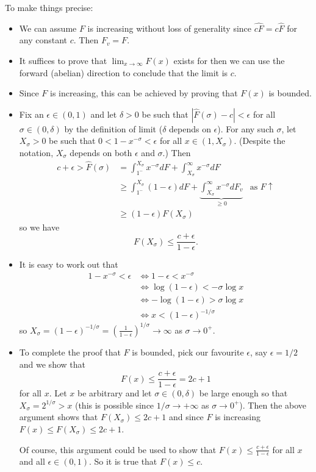 \documentclass[12pt]{article}
\newcommand{\Fhat}{\widehat{F}}
\begin{document}
To make things precise:
\begin{itemize}
\item We can assume $F$ is increasing without loss of generality since $\widehat{c F} = c \Fhat$ for any constant $c$. Then $F_v = F$.

\item It suffices to prove that $\lim_{x \rightarrow \infty} F(x)$ exists for then we can use the forward (abelian) direction to conclude that the limit is $c$.

\item Since $F$ is increasing, this can be achieved by proving that $F(x)$ is bounded.

\item Fix an $\epsilon \in (0, 1)$ and let $\delta > 0$ be such that $|\Fhat(\sigma) - c| < \epsilon$ for all $\sigma \in (0, \delta)$ by the definition of limit ($\delta$ depends on $\epsilon$). For any such $\sigma$, let $X_\sigma > 0$ be such that $0 < 1 - x^{-\sigma} < \epsilon$ for all $x \in (1, X_\sigma)$. (Despite the notation, $X_\sigma$ depends on both $\epsilon$ and $\sigma$.) Then
\begin{align*}
c + \epsilon > \Fhat(\sigma) &= \int_{1^-}^{X_\sigma} x^{-\sigma} dF + \int_{X_\sigma}^\infty x^{-\sigma} dF\\
&\geq \int_{1^-}^{X_\sigma} (1 - \epsilon) dF + \underbrace{\int_{X_\sigma}^\infty x^{-\sigma} dF_v}_{\geq 0} &\text{as } F \uparrow\\
&\geq (1 - \epsilon) F(X_\sigma)
\end{align*}
so we have
$$F(X_\sigma) \leq \frac{c + \epsilon}{1 - \epsilon}.$$

\item It is easy to work out that
\begin{align*}
1 - x^{-\sigma} < \epsilon &\iff 1 - \epsilon < x^{-\sigma}\\
&\iff \log(1 - \epsilon) < -\sigma \log x\\
&\iff -\log(1-\epsilon) > \sigma \log x\\
&\iff x < (1 - \epsilon)^{-1/\sigma}
\end{align*}
so $X_\sigma = (1 - \epsilon)^{-1/\sigma} = \left( \frac{1}{1 - \epsilon} \right)^{1/\sigma} \rightarrow \infty$ as $\sigma \rightarrow 0^+$.

\item To complete the proof that $F$ is bounded, pick our favourite $\epsilon$, say $\epsilon = 1/2$ and we show that
$$F(x) \leq \frac{c + \epsilon}{1 - \epsilon} = 2 c + 1$$
for all $x$. Let $x$ be arbitrary and let $\sigma \in (0, \delta)$ be large enough so that $X_\sigma = 2^{1/\sigma} > x$ (this is possible since $1/\sigma \rightarrow +\infty$ as $\sigma \rightarrow 0^+$). Then the above argument shows that $F(X_\sigma) \leq 2c + 1$ and since $F$ is increasing $F(x) \leq F(X_\sigma) \leq 2c + 1$.

Of course, this argument could be used to show that $F(x) \leq \frac{c + \epsilon}{1 - \epsilon}$ for all $x$ and all $\epsilon \in (0, 1)$. So it is true that $F(x) \leq c$.
\end{itemize}

\unless\ifdefined\IsMainDocument
\end{document}
